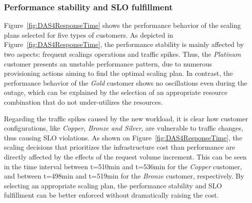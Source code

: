 


\subsubsection{Performance stability and SLO fulfillment}

Figure~\ref{fig:DAS4ResponseTime} shows the performance behavior of the scaling plans selected for five types of customers. As depicted in Figure~\ref{fig:DAS4ResponseTime}, the performance stability is mainly affected by two aspects: frequent scalings operations and traffic spikes. Thus, the \emph{Platinum} customer presents an unstable performance pattern, due to numerous provisioning actions aiming to find the optimal scaling plan. In contrast, the performance behavior of the \emph{Gold} customer shows no oscillations even during the outage, which can be explained by the selection of an appropriate resource combination that do not under-utilizes the resources.



Regarding the traffic spikes caused by the new workload, it is clear how customer configurations, like \emph{Copper, Bronze and Silver}, are vulnerable to traffic changes, thus causing SLO violations. As shown on Figure~\ref{fig:DAS4ResponseTime},  the scaling decisions that prioritizes the infrastructure cost than performance are directly affected by the effects of the request volume increment. This can be seen in the time interval between t=510min and t=536min for the \emph{Copper} customer, and between t=498min and t=519min for the \emph{Bronze} customer, respectively. By selecting an appropriate scaling plan, the performance stability and SLO fulfillment can be better enforced without dramatically raising the cost.






